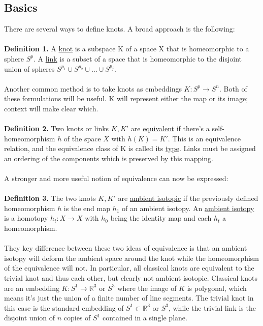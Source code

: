 \documentclass{article}
\begin{document}
\subsection{Basics}
There are several ways to define knots.  A broad approach is the following:
\\
\\
\textbf{Definition 1.} A \underline{knot} is a subspace K of a space X that is homeomorphic to a sphere $S^p$.  A \underline{link}
is a subset of a space that is homeomorphic to the disjoint union of spheres $S^{p_1} \cup S^{p_2} \cup \ldots \cup S^{p_j}$. 
\\
\\
Another common method is to take knots as embeddings $K: S^p \rightarrow S^n$.  Both of these formulations will be useful.  K will represent 
either the map or its image; context will make clear which.
\\
\\
\textbf{Definition 2.} Two knots or links $K, K'$ are \underline{equivalent} if there's a self-homeomorphism $h$ of the space $X$ with $h(K) = K'$.
This is an equivalence relation, and the equivalence class of K is called its \underline{type}.  Links must be assigned an ordering of the components which is preserved by this mapping.
\\
\\
A stronger and more useful notion of equivalence can now be expressed:
\\
\\
\textbf{Definition 3.} The two knots $K, K'$ are \underline{ambient isotopic} if the previously defined homeomorphism $h$ is the end map $h_1$
of an ambient isotopy.  An \underline{ambient isotopy} is a homotopy $h_t: X \rightarrow X$ with $h_0$ being the identity map and each $h_t$ a 
homeomorphism.
\\
\\
They key difference between these two ideas of equivalence is that an ambient isotopy will deform the ambient space around the knot while
the homeomorphism of the equivalence will not.  In particular, all classical knots are equivalent to the trivial knot and thus each other, but clearly not ambient isotopic.  Classical knots are an embedding
$K: S^1 \rightarrow \mathbb{R}^3$ or $S^3$ where the image of $K$ is polygonal, which means it's just the union of a finite number of line segments.  The trivial knot in this case is the standard embedding of $S^1 \subset \mathbb{R}^3$ or $S^3$, while the trivial link is the disjoint union of $n$ copies of $S^1$ contained in a single plane.
\end{document}
